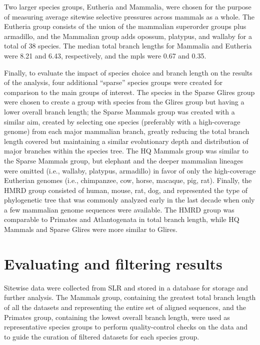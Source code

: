 Two larger species groups, Eutheria and Mammalia, were chosen for the
purpose of measuring average sitewise selective pressures across
mammals as a whole. The Eutheria group consists of the union of the
mammalian superorder groups plus armadillo, and the Mammalian group
adds opossum, platypus, and wallaby for a total of 38 species. The
median total branch lengths for Mammalia and Eutheria were 8.21 and
6.43, respectively, and the \ac{mpl}s were 0.67 and 0.35.

Finally, to evaluate the impact of species choice and branch length on
the results of the \sw analysis, four additional ``sparse'' species
groups were created for comparison to the main groups of interest. The
species in the Sparse Glires group were chosen to create a group with
species from the Glires group but having a lower overall branch
length; the Sparse Mammals group was created with a similar aim,
created by selecting one species (preferably with a high-coverage
genome) from each major mammalian branch, greatly reducing the total
branch length covered but maintaining a similar evolutionary depth and
distribution of major branches within the species tree. The HQ Mammals
group was similar to the Sparse Mammals group, but elephant and the
deeper mammalian lineages were omitted (i.e., wallaby, platypus,
armadillo) in favor of only the high-coverage Eutherian genomes (i.e.,
chimpanzee, cow, horse, macaque, pig, rat). Finally, the HMRD group
consisted of human, mouse, rat, dog, and represented the type of
phylogenetic tree that was commonly analyzed early in the last decade
when only a few mammalian genome sequences were available. The HMRD
group was comparable to Primates and Atlantogenata in total branch
length, while HQ Mammals and Sparse Glires were more similar to
Glires.

\section{Evaluating and filtering \sw results}
\label{section_sitewise_filtering}

Sitewise data were collected from SLR and stored in a database for
storage and further analysis. The Mammals group, containing the
greatest total branch length of all the datasets and representing the
entire set of aligned sequences, and the Primates group, containing
the lowest overall branch length, were used as representative species
groups to perform quality-control checks on the \sw data and to guide
the curation of filtered \sw datasets for each species group.


